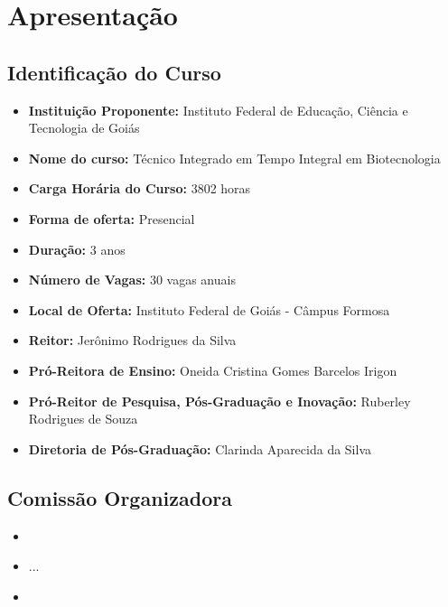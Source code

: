 \documentclass[11pt,fleqn]{book} %
\begin{document}
\renewcommand\contentsname{Sumário}
\tableofcontents

\chapter{Apresentação}
\vspace{6em}
\begin{flushright}
	\textit{ }
\end{flushright}
\vspace{12em}
\indent


\section{Identificação do Curso}
\begin{itemize}
	\item \textbf{Instituição Proponente:} Instituto Federal de Educação, Ciência e Tecnologia de Goiás
	\item \textbf{Nome do curso:} Técnico Integrado em Tempo Integral em Biotecnologia
	\item \textbf{Carga Horária do Curso:} 3802 horas
	\item \textbf{Forma de oferta:} Presencial
	\item \textbf{Duração:} 3 anos
	\item \textbf{Número de Vagas:} 30 vagas anuais
	\item \textbf{Local de Oferta:} Instituto Federal de Goiás - Câmpus Formosa
	\item \textbf{Reitor:} Jerônimo Rodrigues da Silva
	\item \textbf{Pró-Reitora de Ensino:} Oneida Cristina Gomes Barcelos Irigon
	\item \textbf{Pró-Reitor de Pesquisa, Pós-Graduação e Inovação:} Ruberley Rodrigues de Souza
	\item \textbf{Diretoria de Pós-Graduação:} Clarinda Aparecida da Silva
\end{itemize}

\newpage  
\section{Comissão Organizadora}
	\begin{itemize}[label=\bfseries]
		\item {}
		\item ...
		\item {}
	\end{itemize}
\end{document}
